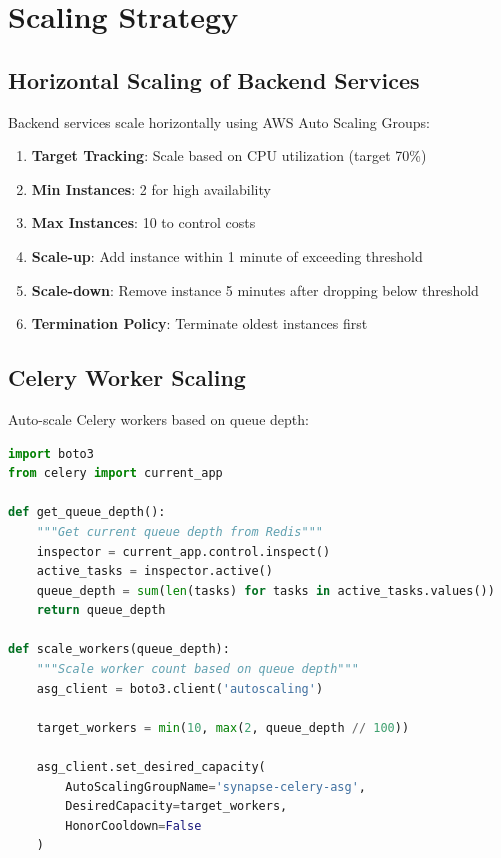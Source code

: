 \documentclass{report}
\begin{document}
\chapter{Scaling Strategy}

\section{Horizontal Scaling of Backend Services}

Backend services scale horizontally using AWS Auto Scaling Groups:

\begin{enumerate}
  \item \textbf{Target Tracking}: Scale based on CPU utilization (target 70\%)
  \item \textbf{Min Instances}: 2 for high availability
  \item \textbf{Max Instances}: 10 to control costs
  \item \textbf{Scale-up}: Add instance within 1 minute of exceeding threshold
  \item \textbf{Scale-down}: Remove instance 5 minutes after dropping below threshold
  \item \textbf{Termination Policy}: Terminate oldest instances first
\end{enumerate}

\section{Celery Worker Scaling}

Auto-scale Celery workers based on queue depth:

\begin{lstlisting}[language=python, caption=Queue Depth Based Scaling]
import boto3
from celery import current_app

def get_queue_depth():
    """Get current queue depth from Redis"""
    inspector = current_app.control.inspect()
    active_tasks = inspector.active()
    queue_depth = sum(len(tasks) for tasks in active_tasks.values())
    return queue_depth

def scale_workers(queue_depth):
    """Scale worker count based on queue depth"""
    asg_client = boto3.client('autoscaling')
    
    target_workers = min(10, max(2, queue_depth // 100))
    
    asg_client.set_desired_capacity(
        AutoScalingGroupName='synapse-celery-asg',
        DesiredCapacity=target_workers,
        HonorCooldown=False
    )
\end{lstlisting}
\end{document}
